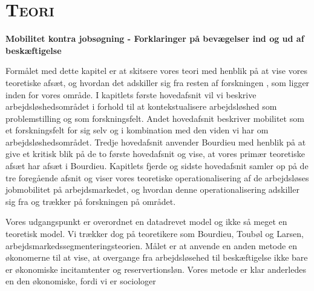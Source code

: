 
\chapter{\textsc{Teori}} \label{teori}
\textbf{Mobilitet kontra jobsøgning - Forklaringer på bevægelser ind og ud af beskæftigelse}

Formålet med dette kapitel er at skitsere vores teori med henblik på at vise vores teoretiske afsæt, og hvordan det adskiller sig fra resten af forskningen %
, som ligger inden for vores område. I kapitlets første hovedafsnit vil vi beskrive arbejdsløshedsområdet i forhold til at kontekstualisere arbejdsløshed som problemstilling og som forskningsfelt. %
Andet hovedafsnit beskriver mobilitet som et forskningsfelt for sig selv og i kombination med den viden vi har om arbejdsløshedsområdet. Tredje hovedafsnit anvender Bourdieu med henblik på at give et kritisk blik på de to første hovedafsnit og vise, at vores primær teoretiske afsæt har afsæt i Bourdieu. %
Kapitlets fjerde og sidste hovedafsnit samler op på de tre foregående afsnit og viser vores teoretiske operationalisering af de arbejdsløses jobmobilitet på arbejdsmarkedet, og hvordan denne operationalisering adskiller sig fra og trækker på forskningen på området. %

Vores udgangspunkt er overordnet en datadrevet model og ikke så meget en teoretisk model. Vi trækker dog på teoretikere som Bourdieu, Toubøl og Larsen, arbejdsmarkedssegmenteringsteorien. Målet er at anvende en anden metode en økonomerne til at vise, at overgange fra arbejdsløsehed til beskæftigelse ikke bare er økonomiske incitamtenter og reservertionsløn. Vores metode er klar anderledes en den økonomiske, fordi vi er sociologer %


